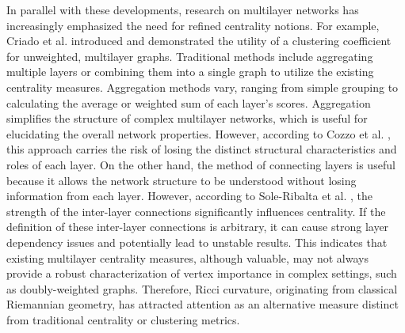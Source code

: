 \documentclass[preprint,12pt,number]{elsarticle}
\theoremstyle{plain} %
\theoremstyle{definition} %
\begin{document}
In parallel with these developments, research on multilayer networks has increasingly emphasized the need for refined centrality notions. For example, Criado et al. \cite{Criado01022012} introduced and demonstrated the utility of a clustering coefficient for unweighted, multilayer graphs. Traditional methods include aggregating multiple layers or combining them into a single graph to utilize the existing centrality measures. Aggregation methods vary, ranging from simple grouping to calculating the average or weighted sum of each layer's scores. 
Aggregation simplifies the structure of complex multilayer networks, which is useful for elucidating the overall network properties. However, according to Cozzo et al. \cite{Cozzo_2015}, this approach carries the risk of losing the distinct structural characteristics and roles of each layer. 
On the other hand, the method of connecting layers is useful because it allows the network structure to be understood without losing information from each layer. However, according to Sole-Ribalta et al. \cite{Albert}, the strength of the inter-layer connections significantly influences centrality. If the definition of these inter-layer connections is arbitrary, it can cause strong layer dependency issues and potentially lead to unstable results. 
This indicates that existing multilayer centrality measures, although valuable, may not always provide a robust characterization of vertex importance in complex settings, such as doubly-weighted graphs. 
Therefore, Ricci curvature, originating from classical Riemannian geometry, has attracted attention as an alternative measure distinct from traditional centrality or clustering metrics. 
\end{document}
